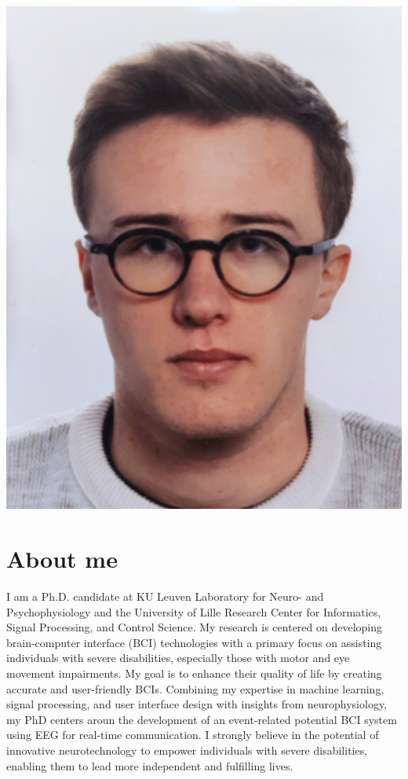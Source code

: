 \documentclass[10pt,a4paper]{article}
\begin{document}
\begin{minipage}[b]{.29\linewidth}
	\includegraphics[width=\linewidth]{photo.jpg}
\end{minipage}


\section*{About me}

I am a Ph.D. candidate at KU Leuven Laboratory for Neuro- and Psychophysiology
and the University of Lille Research Center for Informatics, Signal Processing,
and Control Science. My research is centered on developing brain-computer
interface (BCI) technologies with a primary focus on assisting individuals with
severe disabilities, especially those with motor and eye movement impairments.
My goal is to enhance their quality of life by creating accurate and
user-friendly BCIs. Combining my expertise in machine learning, signal
processing, and user interface design with insights from neurophysiology, my
PhD centers aroun the development of an event-related potential BCI system using EEG for real-time communication. I strongly believe in the potential of innovative neurotechnology to empower individuals with severe disabilities, enabling them to lead more independent and fulfilling lives.
\end{document}
